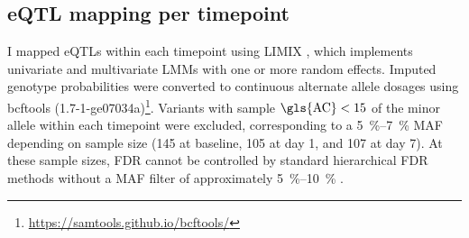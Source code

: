 \subsection{eQTL mapping per timepoint}
\label{subsec:hird_reQTL_limix}

%
I mapped \glspl{eQTL} within each timepoint using {LIMIX} \autocite{lippert2014LIMIXGeneticAnalysis}, which implements univariate and multivariate \glspl{LMM} with one or more random effects.
Imputed genotype probabilities were converted to continuous alternate allele dosages using bcftools (1.7-1-ge07034a)\footnote{\url{https://samtools.github.io/bcftools/}}.
Variants with sample $\text{\gls{AC}} < 15$ of the minor allele within each timepoint were excluded, 
corresponding to a \SIrange{5}{7}{\percent} \gls{MAF} depending on sample size (145 at baseline, 105 at day 1, and 107 at day 7).
At these sample sizes, \gls{FDR} cannot be controlled by standard hierarchical \gls{FDR} methods without a \gls{MAF} filter of approximately \SIrange{5}{10}{\percent} \autocite{huang2018PowerFalseDiscovery}.

